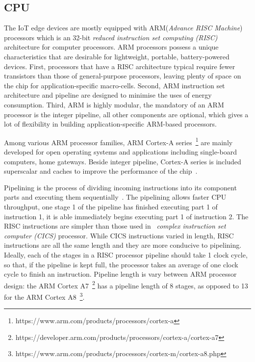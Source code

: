 
\subsection{CPU}
\label{ss:CPU}

The IoT edge devices are mostly equipped with ARM(\textit{Advance RISC Machine}) processors which is an 32-bit \textit{reduced instruction set computing (RISC)} architecture for computer processors.
ARM processors possess a unique characteristics that are desirable for lightweight, portable, battery-powered devices.
First, processors that have a RISC architecture typical require fewer transistors than those of general-purpose processors, leaving plenty of space on the chip for application-specific macro-cells.
Second, ARM instruction set architecture and pipeline are designed to minimise the uses of energy consumption.
Third, ARM is highly modular, the mandatory of an ARM processor is the integer pipeline, all other components are optional, which gives a lot of flexibility in building application-specific ARM-based processors.

Among various ARM processor families, ARM Cortex-A series~\footnote{https://www.arm.com/products/processors/cortex-a} are mainly developed for open operating systems and applications including single-board computers, home gateways. 
Beside integer pipeline, Cortex-A series is included superscalar and caches to improve the performance of the chip~\citep{Wang:2011}. 

Pipelining is the process of dividing incoming instructions into its component parts and executing them sequentially~\citep{Molnar:1994}.
The pipelining allows faster CPU throughput, one stage 1 of the pipeline has finished executing part 1 of instruction 1, it is able immediately begins executing part 1 of instruction 2.
The RISC instructions are simpler than those used in ~\textit{complex instruction set computer (CICS)} processor.
While CICS instructions varied in length, RISC instructions are all the same length and they are more conducive to pipelining.
Ideally, each of the stages in a RISC processor pipeline should take 1 clock cycle, so that, if the pipeline is kept full, the processor takes an average of one clock cycle to finish an instruction.
Pipeline length is vary between ARM processor design: the ARM Cortex A7~\footnote{https://developer.arm.com/products/processors/cortex-a/cortex-a7} has a pipeline length of 8 stages, as opposed to 13 for the ARM Cortex A8~\footnote{https://www.arm.com/products/processors/cortex-m/cortex-a8.php}.

